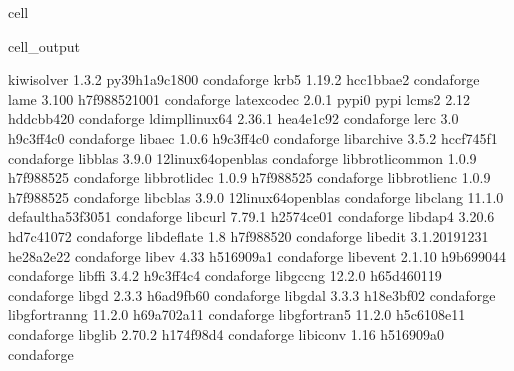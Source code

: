 \documentclass[letterpaper,table,10pt,english]{jupyterBook}
\begin{document}
\begin{sphinxuseclass}{cell}
\begin{sphinxVerbatimOutput}
\begin{sphinxuseclass}{cell_output}
\begin{sphinxVerbatim}[commandchars=\\\{\}]
kiwisolver                1.3.2            py39h1a9c180\PYGZus{}0    conda\PYGZhy{}forge
krb5                      1.19.2               hcc1bbae\PYGZus{}2    conda\PYGZhy{}forge
lame                      3.100             h7f98852\PYGZus{}1001    conda\PYGZhy{}forge
latexcodec                2.0.1                    pypi\PYGZus{}0    pypi
lcms2                     2.12                 hddcbb42\PYGZus{}0    conda\PYGZhy{}forge
ld\PYGZus{}impl\PYGZus{}linux\PYGZhy{}64          2.36.1               hea4e1c9\PYGZus{}2    conda\PYGZhy{}forge
lerc                      3.0                  h9c3ff4c\PYGZus{}0    conda\PYGZhy{}forge
libaec                    1.0.6                h9c3ff4c\PYGZus{}0    conda\PYGZhy{}forge
libarchive                3.5.2                hccf745f\PYGZus{}1    conda\PYGZhy{}forge
libblas                   3.9.0           12\PYGZus{}linux64\PYGZus{}openblas    conda\PYGZhy{}forge
libbrotlicommon           1.0.9                h7f98852\PYGZus{}5    conda\PYGZhy{}forge
libbrotlidec              1.0.9                h7f98852\PYGZus{}5    conda\PYGZhy{}forge
libbrotlienc              1.0.9                h7f98852\PYGZus{}5    conda\PYGZhy{}forge
libcblas                  3.9.0           12\PYGZus{}linux64\PYGZus{}openblas    conda\PYGZhy{}forge
libclang                  11.1.0          default\PYGZus{}ha53f305\PYGZus{}1    conda\PYGZhy{}forge
libcurl                   7.79.1               h2574ce0\PYGZus{}1    conda\PYGZhy{}forge
libdap4                   3.20.6               hd7c4107\PYGZus{}2    conda\PYGZhy{}forge
libdeflate                1.8                  h7f98852\PYGZus{}0    conda\PYGZhy{}forge
libedit                   3.1.20191231         he28a2e2\PYGZus{}2    conda\PYGZhy{}forge
libev                     4.33                 h516909a\PYGZus{}1    conda\PYGZhy{}forge
libevent                  2.1.10               h9b69904\PYGZus{}4    conda\PYGZhy{}forge
libffi                    3.4.2                h9c3ff4c\PYGZus{}4    conda\PYGZhy{}forge
libgcc\PYGZhy{}ng                 12.2.0              h65d4601\PYGZus{}19    conda\PYGZhy{}forge
libgd                     2.3.3                h6ad9fb6\PYGZus{}0    conda\PYGZhy{}forge
libgdal                   3.3.3                h18e3bf0\PYGZus{}2    conda\PYGZhy{}forge
libgfortran\PYGZhy{}ng            11.2.0              h69a702a\PYGZus{}11    conda\PYGZhy{}forge
libgfortran5              11.2.0              h5c6108e\PYGZus{}11    conda\PYGZhy{}forge
libglib                   2.70.2               h174f98d\PYGZus{}4    conda\PYGZhy{}forge
libiconv                  1.16                 h516909a\PYGZus{}0    conda\PYGZhy{}forge

\end{sphinxVerbatim}
\end{sphinxuseclass}
\end{sphinxVerbatimOutput}
\end{sphinxuseclass}
\end{document}
